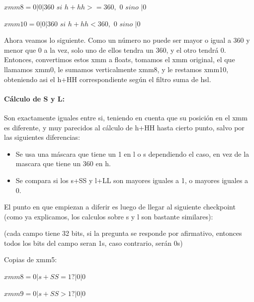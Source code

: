 \documentclass[a4paper]{article}
\begin{document}
$xmm8= 0 | 0 | 360$ $si$ $h+hh>=360,$ $0$ $sino$ $| 0$

\vspace*{0.3cm}

$xmm10=0 | 0 | 360$ $si$ $h+hh<360,$ $0$ $sino$ $| 0$

\vspace*{0.3cm}

Ahora veamos lo siguiente. Como un número no puede ser mayor o igual a 360 y menor que 0 a la vez, solo uno de ellos tendra un 360, y el otro tendrá 0. Entonces, convertimos estos xmm a floats, tomamos el xmm original, el que llamamos xmm0, le sumamos verticalmente xmm8, y le restamos xmm10, obteniendo asi el h+HH correspondiente según el filtro suma de hsl.

\paragraph*{Cálculo de S y L:}

Son exactamente iguales entre si, teniendo en cuenta que su posición en el xmm es diferente, y muy parecidos al cálculo de h+HH hasta cierto punto, salvo por las siguientes diferencias:

\begin{itemize}
	\item Se usa una máscara que tiene un 1 en l o s dependiendo el caso, en vez de la mascara que tiene un 360 en h.
	\item Se compara si los s+SS y l+LL son mayores iguales a 1, o mayores iguales a 0.
\end{itemize}

El punto en que empiezan a diferir es luego de llegar al siguiente checkpoint (como ya explicamos, los calculos sobre s y l son bastante similares):

\vspace*{0.3cm}

(cada campo tiene 32 bits, si la pregunta se responde por afirmativo, entonces todos los bits del campo seran 1s, caso contrario, serán 0s)

\vspace*{0.3cm}

Copias de xmm5:

\vspace*{0.3cm}

$xmm8= 0 | s+SS = 1?| 0 | 0$

\vspace*{0.3cm} 

$xmm9=0 |s+SS > 1?| 0 | 0$
\end{document}
